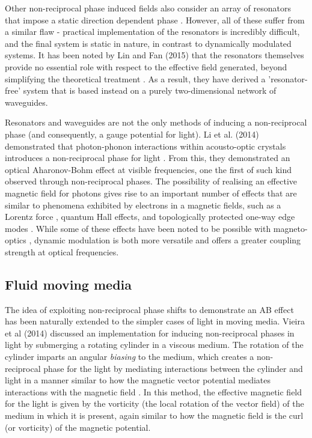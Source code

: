  Other non-reciprocal phase induced fields also consider an array of resonators that impose a static direction dependent phase \cite{Haldane2008b}. However, all of these suffer from a similar flaw - practical implementation of the resonators is incredibly difficult, and the final system is static in nature, in contrast to dynamically modulated systems. It has been noted by Lin and Fan (2015) that the resonators themselves provide no essential role with respect to the effective field generated, beyond simplifying the theoretical treatment \cite{Lin2015a}. As a result, they have derived a 'resonator-free' system that is based instead on a purely two-dimensional network of waveguides.  
 
 Resonators and waveguides are not the only methods of inducing a non-reciprocal phase (and consequently, a gauge potential for light). Li et al. (2014) demonstrated that photon-phonon interactions within acousto-optic crystals introduces a non-reciprocal phase for light \cite{Li2014a}. From this, they demonstrated an optical Aharonov-Bohm effect at visible frequencies, one the first of such kind observed through non-reciprocal phases. The possibility of realising an effective magnetic field for photons gives rise to an important number of effects that are similar to phenomena exhibited by electrons in a magnetic fields, such as a Lorentz force \cite{Fang2012}, quantum Hall effects, and topologically protected one-way edge modes \cite{Fang2013}. While some of these effects have been noted to be possible with magneto-optics \cite{Wang2009, Lee2017a}, dynamic modulation is both more versatile and offers a greater coupling strength at optical frequencies.
 
 \subsection{Fluid moving media}
 
 The idea of exploiting non-reciprocal phase shifts to demonstrate an AB effect has been naturally extended to the simpler cases of light in moving media. Vieira et al (2014) discussed an implementation for inducing non-reciprocal phases in light by submerging a rotating cylinder in a viscous medium. The rotation of the cylinder imparts an angular \textit{biasing} to the medium, which creates a non-reciprocal phase for the light by mediating interactions between the cylinder and light in a manner similar to how the magnetic vector potential mediates interactions with the magnetic field \cite{Vieira2014a}. In this method, the effective magnetic field for the light is given by the vorticity (the local rotation of the vector field) of the medium in which it is present, again similar to how the magnetic field is the curl (or vorticity) of the magnetic potential. 
 
